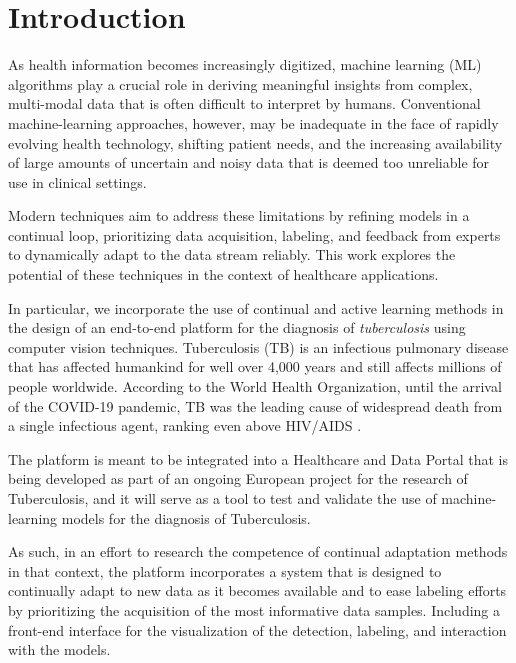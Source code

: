 \documentclass[../main.tex]{subfiles}
\begin{document}
\chapter{Introduction}
\label{chap:intro}

 As health information becomes increasingly digitized, machine learning (ML) algorithms play a crucial role in deriving meaningful insights from complex, multi-modal data that is often difficult to interpret by humans. 
 Conventional machine-learning approaches, however, may be inadequate in the face of rapidly evolving health technology, shifting patient needs, and the increasing availability of large amounts of uncertain and noisy data that is deemed too unreliable for use in clinical settings.

 Modern techniques aim to address these limitations by refining models in a continual loop, prioritizing data acquisition, labeling, and feedback from experts to dynamically adapt to the data stream reliably. This work explores the potential of these techniques in the context of healthcare applications.
 
 In particular, we incorporate the use of continual and active learning methods in the design of an end-to-end platform for the diagnosis of \textit{tuberculosis} using computer vision techniques. Tuberculosis (TB) is an infectious pulmonary disease that has affected humankind for well over 4,000 years \cite{cdctb_world_2023} and still affects millions of people worldwide. According to the World Health Organization, until the arrival of the COVID-19 pandemic, TB was the leading cause of widespread death from a single infectious agent, ranking even above HIV/AIDS \cite{who_global_2022}.

 The platform is meant to be integrated into a Healthcare and Data Portal that is being developed as part of an ongoing European project for the research of Tuberculosis, and it will serve as a tool to test and validate the use of machine-learning models for the diagnosis of Tuberculosis. 

 As such, in an effort to research the competence of continual adaptation methods in that context, the platform incorporates a system that is designed to continually adapt to new data as it becomes available and to ease labeling efforts by prioritizing the acquisition of the most informative data samples. Including a front-end interface for the visualization of the detection, labeling, and interaction with the models.
 
\end{document}
